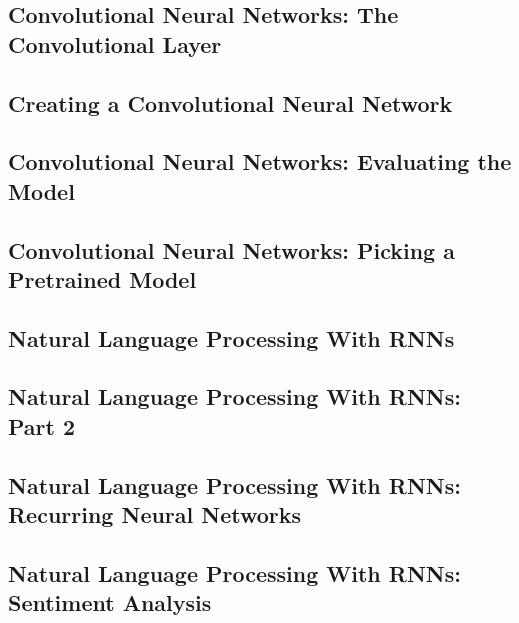 \documentclass{article}%
\begin{document}
%
\subsection{Convolutional Neural Networks: The Convolutional Layer}%
\label{subsec:ConvolutionalNeuralNetworksTheConvolutionalLayer}%

%
\subsection{Creating a Convolutional Neural Network}%
\label{subsec:CreatingaConvolutionalNeuralNetwork}%

%
\subsection{Convolutional Neural Networks: Evaluating the Model}%
\label{subsec:ConvolutionalNeuralNetworksEvaluatingtheModel}%

%
\subsection{Convolutional Neural Networks: Picking a Pretrained Model}%
\label{subsec:ConvolutionalNeuralNetworksPickingaPretrainedModel}%

%
\subsection{Natural Language Processing With RNNs}%
\label{subsec:NaturalLanguageProcessingWithRNNs}%

%
\subsection{Natural Language Processing With RNNs: Part 2}%
\label{subsec:NaturalLanguageProcessingWithRNNsPart2}%

%
\subsection{Natural Language Processing With RNNs: Recurring Neural Networks}%
\label{subsec:NaturalLanguageProcessingWithRNNsRecurringNeuralNetworks}%

%
\subsection{Natural Language Processing With RNNs: Sentiment Analysis}%
\label{subsec:NaturalLanguageProcessingWithRNNsSentimentAnalysis}%
\end{document}
